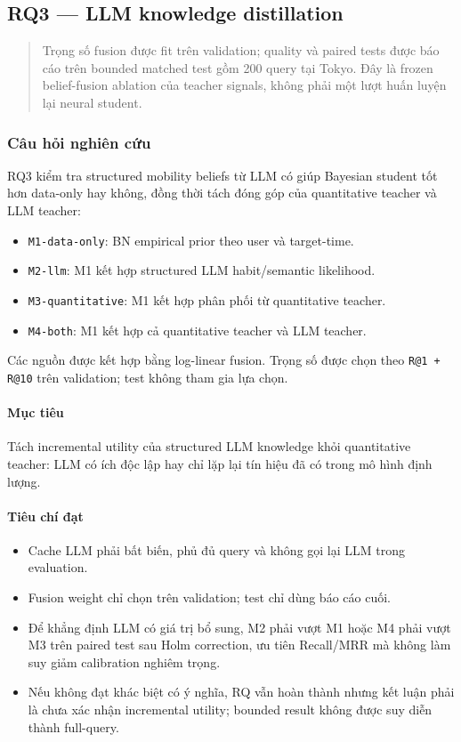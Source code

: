 \subsection{RQ3 --- LLM knowledge distillation}

\begin{quote}\small Trọng số fusion được fit trên validation; quality và paired tests được báo cáo trên bounded matched test gồm 200 query tại Tokyo. Đây là frozen belief-fusion ablation của teacher signals, không phải một lượt huấn luyện lại neural student.\end{quote}
\subsubsection*{Câu hỏi nghiên cứu}

RQ3 kiểm tra structured mobility beliefs từ LLM có giúp Bayesian student tốt hơn data-only hay không, đồng thời tách đóng góp của quantitative teacher và LLM teacher:

\begin{itemize}
\item \texttt{M1-data-only}: BN empirical prior theo user và target-time.
\item \texttt{M2-llm}: M1 kết hợp structured LLM habit/semantic likelihood.
\item \texttt{M3-quantitative}: M1 kết hợp phân phối từ quantitative teacher.
\item \texttt{M4-both}: M1 kết hợp cả quantitative teacher và LLM teacher.
\end{itemize}

Các nguồn được kết hợp bằng log-linear fusion. Trọng số được chọn theo \texttt{R@1 + R@10} trên validation; test không tham gia lựa chọn.

\paragraph{Mục tiêu}

Tách incremental utility của structured LLM knowledge khỏi quantitative teacher: LLM có ích độc lập hay chỉ lặp lại tín hiệu đã có trong mô hình định lượng.

\paragraph{Tiêu chí đạt}

\begin{itemize}
\item Cache LLM phải bất biến, phủ đủ query và không gọi lại LLM trong evaluation.
\item Fusion weight chỉ chọn trên validation; test chỉ dùng báo cáo cuối.
\item Để khẳng định LLM có giá trị bổ sung, M2 phải vượt M1 hoặc M4 phải vượt M3
trên paired test sau Holm correction, ưu tiên Recall/MRR mà không làm suy giảm calibration nghiêm trọng.

\item Nếu không đạt khác biệt có ý nghĩa, RQ vẫn hoàn thành nhưng kết luận phải là
chưa xác nhận incremental utility; bounded result không được suy diễn thành full-query.

\end{itemize}

